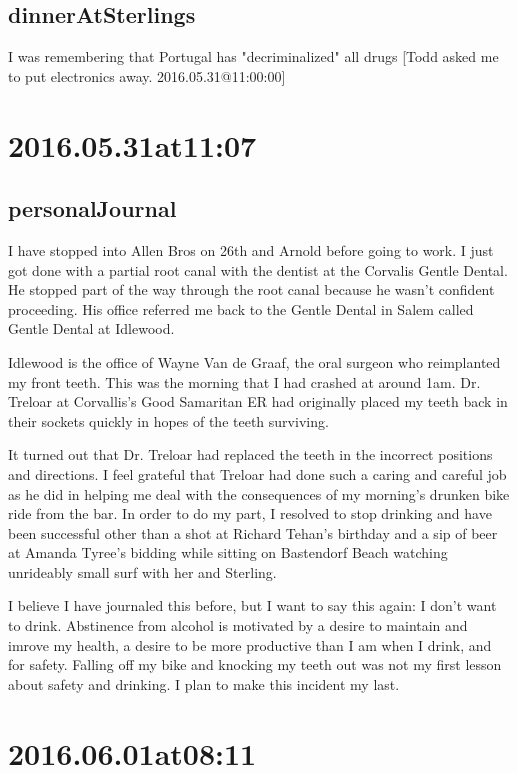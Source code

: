 \begin{enumerate}
\subsection*{dinnerAtSterlings}
I was remembering that Portugal has "decriminalized" all drugs [Todd asked me to put electronics away. 2016.05.31@11:00:00]

\section*{ 2016.05.31at11:07 }
\subsection*{personalJournal}
I have stopped into Allen Bros on 26th and Arnold before going to work. I just got done with a partial root canal with the dentist at the Corvalis Gentle Dental. He stopped part of the way through the root canal because he wasn't confident proceeding. His office referred me back to the Gentle Dental in Salem called Gentle Dental at Idlewood.

Idlewood is the office of Wayne Van de Graaf, the oral surgeon who reimplanted my front teeth. This was the morning that I had crashed at around 1am. Dr. Treloar at Corvallis's Good Samaritan ER had originally placed my teeth back in their sockets quickly in hopes of the teeth surviving.

It turned out that Dr. Treloar had replaced the teeth in the incorrect positions and directions. I feel grateful that Treloar had done such a caring and careful job as he did in helping me deal with the consequences of my morning's drunken bike ride from the bar. In order to do my part, I resolved to stop drinking and have been successful other than a shot at Richard Tehan's birthday and a sip of beer at Amanda Tyree's bidding while sitting on Bastendorf Beach watching unrideably small surf with her and Sterling.

I believe I have journaled this before, but I want to say this again: I don't want to drink. Abstinence from alcohol is motivated by a desire to maintain and imrove my health, a desire to be more productive than I am when I drink, and for safety. Falling off my bike and knocking my teeth out was not my first lesson about safety and drinking. I plan to make this incident my last.

\section*{ 2016.06.01at08:11 }

\end{enumerate}
